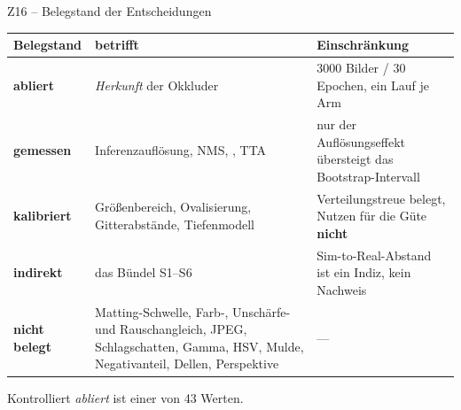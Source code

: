 \documentclass[14pt,aspectratio=169]{beamer}
\begin{document}
\begin{frame}{Z16 -- Belegstand der Entscheidungen}
\zusatzdicht
\begin{center}
\begin{tabular}{@{}L{0.15\textwidth}L{0.30\textwidth}L{0.47\textwidth}@{}}
\toprule
\textbf{Belegstand} & \textbf{betrifft} & \textbf{Einschränkung} \\
\midrule
\textcolor{gut}{\textbf{abliert}} &
\emph{Herkunft} der Okkluder &
3000 Bilder / 30 Epochen, ein Lauf je Arm \\
\addlinespace
\textbf{gemessen} &
Inferenzauflösung, NMS, , TTA &
nur der Auflösungseffekt übersteigt das Bootstrap-Intervall \\
\addlinespace
\textbf{kalibriert} &
Größenbereich, Ovalisierung, Gitterabstände, Tiefenmodell &
Verteilungstreue belegt, Nutzen für die Güte \textbf{nicht} \\
\addlinespace
\textbf{indirekt} &
das Bündel S1--S6 &
Sim-to-Real-Abstand ist ein Indiz, kein Nachweis \\
\addlinespace
\textcolor{warn}{\textbf{nicht belegt}} &
Matting-Schwelle, Farb-, Unschärfe- und Rauschangleich, JPEG,
Schlagschatten, Gamma, HSV, Mulde, Negativanteil, Dellen, Perspektive
& --- \\
\bottomrule
\end{tabular}
\end{center}
Kontrolliert \emph{abliert} ist einer von 43 Werten.
\end{frame}
\end{document}
